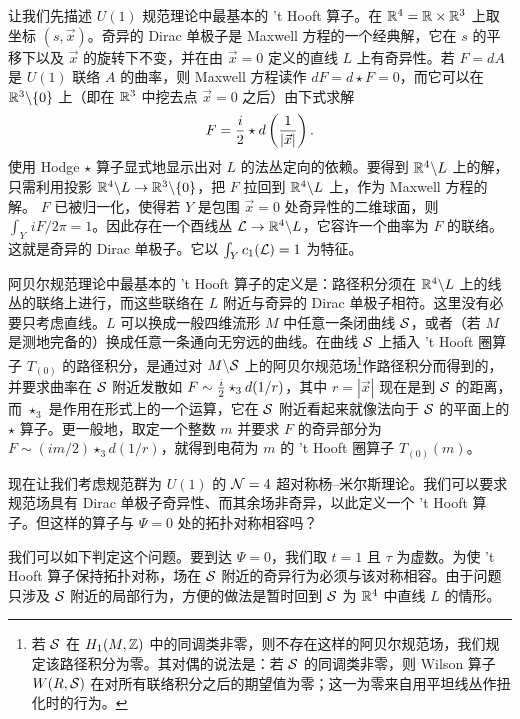 让我们先描述 $U(1)$ 规范理论中最基本的 't Hooft 算子。在 $\Bbb{R}^4=\Bbb{R}\times \Bbb{R}^3$ 上取坐标 $(s,\vec x)$。奇异的 Dirac 单极子是 Maxwell 方程的一个经典解，它在 $s$ 的平移下以及 $\vec x$ 的旋转下不变，并在由 $\vec x=0$ 定义的直线 $L$ 上有奇异性。若 $F=dA$ 是 $U(1)$ 联络 $A$ 的曲率，则 Maxwell 方程读作 $dF=d\star F=0$，而它可以在 $\Bbb{R}^3\backslash \{0\}$ 上（即在 $\Bbb{R}^3$ 中挖去点 $\vec x=0$ 之后）由下式求解 %
\setcounter{equation}{6}
\begin{equation}\label{eq:izo}
F={i\over 2}\star d\left({1\over |\vec
x|}\right).
\end{equation}
  使用 Hodge $\star$ 算子显式地显示出对 $L$ 的法丛定向的依赖。要得到 $\Bbb{R}^4\backslash L$ 上的解，只需利用投影 $\Bbb{R}^4\backslash L\to \Bbb{R}^3\backslash \{0\}$，把 $F$ 拉回到 $\Bbb{R}^4\backslash L$ 上，作为 Maxwell 方程的解。
 $F$ 已被归一化，使得若 $Y$ 是包围 $\vec x=0$ 处奇异性的二维球面，则 $\int_Y \,iF/2\pi =1$。因此存在一个酉线丛 ${\cal L}\to \Bbb{R}^4\backslash L$，它容许一个曲率为 $F$ 的联络。这就是奇异的 Dirac 单极子。它以 $\int_Yc_1({\cal L})=1$ 为特征。

阿贝尔规范理论中最基本的 't Hooft 算子的定义是：路径积分须在 $\Bbb{R}^4\backslash L$ 上的线丛的联络上进行，而这些联络在 $L$ 附近与奇异的 Dirac 单极子相符。这里没有必要只考虑直线。$L$ 可以换成一般四维流形 $M$ 中任意一条闭曲线 ${{\cal S}}$，或者（若 $M$ 是测地完备的）换成任意一条通向无穷远的曲线。在曲线 ${{\cal S}}$ 上插入 't Hooft 圈算子 $T_{(0)}$ 的路径积分，是通过对 $M\backslash {{\cal S}}$ 上的阿贝尔规范场\footnote{若 ${\cal S}$ 在 $H_1(M,\Bbb{Z})$ 中的同调类非零，则不存在这样的阿贝尔规范场，我们规定该路径积分为零。其对偶的说法是：若 ${\cal S}$ 的同调类非零，则 Wilson 算子 $W(R,{\cal S})$ 在对所有联络积分之后的期望值为零；这一为零来自用平坦线丛作扭化时的行为。}作路径积分而得到的，并要求曲率在 ${{\cal S}}$ 附近发散如 $F\sim {i\over 2}\star_3d (1/r)$，其中 $r=|\vec x|$ 现在是到 ${{\cal S}}$ 的距离，而 $\star_3$ 是作用在形式上的一个运算，它在 ${{\cal S}}$ 附近看起来就像法向于 ${{\cal S}}$ 的平面上的 $\star$ 算子。更一般地，取定一个整数 $m$ 并要求 $F$ 的奇异部分为 $F\sim{(im/ 2)}\star_3 d (1/r)$，就得到电荷为 $m$ 的 't Hooft 圈算子 $T_{(0)}(m)$。

现在让我们考虑规范群为 $U(1)$ 的 ${\EUN}=4$ 超对称杨–米尔斯理论。我们可以要求规范场具有 Dirac 单极子奇异性、而其余场非奇异，以此定义一个 't Hooft 算子。但这样的算子与 $\Psi=0$ 处的拓扑对称相容吗？

我们可以如下判定这个问题。要到达 $\Psi=0$，我们取 $t=1$ 且 $\tau$ 为虚数。为使 't Hooft 算子保持拓扑对称，场在 ${{\cal S}}$ 附近的奇异行为必须与该对称相容。由于问题只涉及 ${{\cal S}}$ 附近的局部行为，方便的做法是暂时回到 ${{\cal S}}$ 为 $\Bbb{R}^4$ 中直线 $L$ 的情形。

